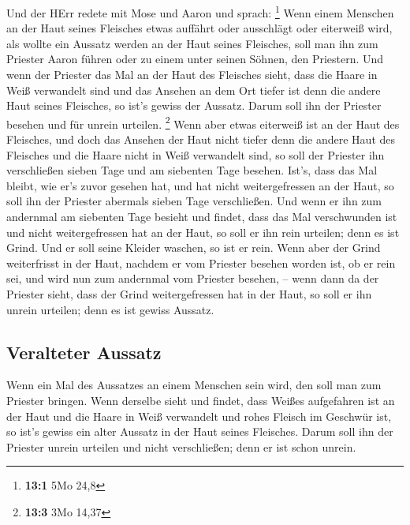  Und der HErr redete mit Mose und Aaron und sprach:
\footnote{\textbf{13:1} 5Mo 24,8}  Wenn einem Menschen an
der Haut seines Fleisches etwas auffährt oder ausschlägt oder eiterweiß
wird, als wollte ein Aussatz werden an der Haut seines Fleisches, soll
man ihn zum Priester Aaron führen oder zu einem unter seinen Söhnen, den
Priestern.  Und wenn der Priester das Mal an der Haut des
Fleisches sieht, dass die Haare in Weiß verwandelt sind und das Ansehen
an dem Ort tiefer ist denn die andere Haut seines Fleisches, so ist's
gewiss der Aussatz. Darum soll ihn der Priester besehen und für unrein
urteilen. \footnote{\textbf{13:3} 3Mo 14,37}  Wenn aber
etwas eiterweiß ist an der Haut des Fleisches, und doch das Ansehen der
Haut nicht tiefer denn die andere Haut des Fleisches und die Haare nicht
in Weiß verwandelt sind, so soll der Priester ihn verschließen sieben
Tage  und am siebenten Tage besehen. Ist's, dass das Mal
bleibt, wie er's zuvor gesehen hat, und hat nicht weitergefressen an der
Haut,  so soll ihn der Priester abermals sieben Tage
verschließen. Und wenn er ihn zum andernmal am siebenten Tage besieht
und findet, dass das Mal verschwunden ist und nicht weitergefressen hat
an der Haut, so soll er ihn rein urteilen; denn es ist Grind. Und er
soll seine Kleider waschen, so ist er rein.  Wenn aber der
Grind weiterfrisst in der Haut, nachdem er vom Priester besehen worden
ist, ob er rein sei, und wird nun zum andernmal vom Priester besehen, --
 wenn dann da der Priester sieht, dass der Grind
weitergefressen hat in der Haut, so soll er ihn unrein urteilen; denn es
ist gewiss Aussatz.

\hypertarget{veralteter-aussatz}{%
\subsection{Veralteter Aussatz}\label{veralteter-aussatz}}

 Wenn ein Mal des Aussatzes an einem Menschen sein wird,
den soll man zum Priester bringen.  Wenn derselbe sieht
und findet, dass Weißes aufgefahren ist an der Haut und die Haare in
Weiß verwandelt und rohes Fleisch im Geschwür ist,  so
ist's gewiss ein alter Aussatz in der Haut seines Fleisches. Darum soll
ihn der Priester unrein urteilen und nicht verschließen; denn er ist
schon unrein.

